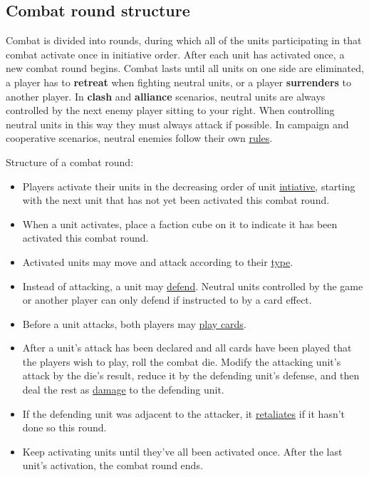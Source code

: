 \documentclass[12pt]{article}
\begin{document}
\subsection*{Combat round structure}
Combat is divided into rounds, during which all of the units participating in that combat activate once in initiative order. After each unit has activated once, a new combat round begins. Combat lasts until all units on one side are eliminated, a player has to \textbf{retreat} when fighting neutral units, or a player \textbf{surrenders} to another player. In \textbf{clash} and \textbf{alliance} scenarios, neutral units are always controlled by the next enemy player sitting to your right. When controlling neutral units in this way they must always attack if possible. In campaign and cooperative scenarios, neutral enemies follow their own \hyperlink{AIrules}{rules}.\par
Structure of a combat round:
\begin{itemize}
    \item Players activate their units in the decreasing order of unit \hyperlink{Initiative}{intiative}, starting with the next unit that has not yet been activated this combat round.
    \item When a unit activates, place a faction cube on it to indicate it has been activated this combat round.
    \item Activated units may move and attack according to their \hyperlink{Unittype}{type}.
    \item Instead of attacking, a unit may \hyperlink{Defend}{defend}. Neutral units controlled by the game or another player can only defend if instructed to by a card effect.
    \item Before a unit attacks, both players may \hyperlink{CombatCards}{play cards}.
    \item After a unit's attack has been declared and all cards have been played that the players wish to play, roll the combat die. Modify the attacking unit's attack by the die's result, reduce it by the defending unit's defense, and then deal the rest as \hyperlink{HP}{damage} to the defending unit.
    \item If the defending unit was adjacent to the attacker, it \hyperlink{Retaliate}{retaliates} if it hasn't done so this round.
    \item Keep activating units until they've all been activated once. After the last unit's activation, the combat round ends.
\end{itemize}
\end{document}
